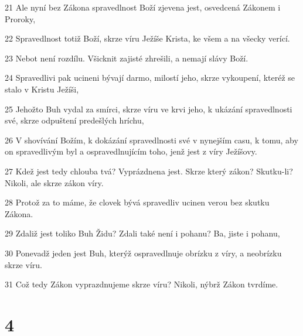 \par 21 Ale nyní bez Zákona spravedlnost Boží zjevena jest, osvedcená Zákonem i Proroky,
\par 22 Spravedlnost totiž Boží, skrze víru Ježíše Krista, ke všem a na všecky verící.
\par 23 Nebot není rozdílu. Všicknit zajisté zhrešili, a nemají slávy Boží.
\par 24 Spravedlivi pak ucineni bývají darmo, milostí jeho, skrze vykoupení, kteréž se stalo v Kristu Ježíši,
\par 25 Jehožto Buh vydal za smírci, skrze víru ve krvi jeho, k ukázání spravedlnosti své, skrze odpuštení predešlých hríchu,
\par 26 V shovívání Božím, k dokázání spravedlnosti své v nynejším casu, k tomu, aby on spravedlivým byl a ospravedlnujícím toho, jenž jest z víry Ježíšovy.
\par 27 Kdež jest tedy chlouba tvá? Vyprázdnena jest. Skrze který zákon? Skutku-li? Nikoli, ale skrze zákon víry.
\par 28 Protož za to máme, že clovek bývá spravedliv ucinen verou bez skutku Zákona.
\par 29 Zdaliž jest toliko Buh Židu? Zdali také není i pohanu? Ba, jiste i pohanu,
\par 30 Ponevadž jeden jest Buh, kterýž ospravedlnuje obrízku z víry, a neobrízku skrze víru.
\par 31 Což tedy Zákon vyprazdnujeme skrze víru? Nikoli, nýbrž Zákon tvrdíme.

\chapter{4}

